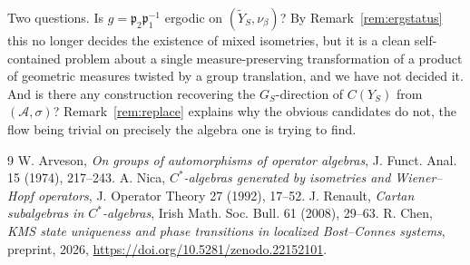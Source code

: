 \documentclass[11pt]{amsart}
\numberwithin{equation}{section}
\theoremstyle{definition}
\theoremstyle{remark}
\newcommand{\cA}{\mathcal{A}}
\newcommand{\pp}{\mathfrak{p}}
\begin{document}
Two questions. Is $g=\pp_2\pp_1^{-1}$ ergodic on $(\widetilde Y_S,\nu_\beta)$? By
Remark~\ref{rem:ergstatus} this no longer decides the existence of mixed isometries, but it
is a clean self-contained problem about a single measure-preserving transformation of a
product of geometric measures twisted by a group translation, and we have not decided it.
And is there any construction recovering
the $G_S$-direction of $C(Y_S)$ from $(\cA,\sigma)$? Remark~\ref{rem:replace} explains why the
obvious candidates do not, the flow being trivial on precisely the algebra one is trying to
find.

\begin{thebibliography}{9}
 W. Arveson, \emph{On groups of automorphisms of operator algebras}, J. Funct. Anal. 15 (1974), 217--243.
 A. Nica, \emph{$C^*$-algebras generated by isometries and Wiener--Hopf operators}, J. Operator Theory 27 (1992), 17--52.
 J. Renault, \emph{Cartan subalgebras in $C^*$-algebras}, Irish Math. Soc. Bull. 61 (2008), 29--63.
 R. Chen, \emph{KMS state uniqueness and phase transitions in localized Bost--Connes systems}, preprint, 2026, \newline\url{https://doi.org/10.5281/zenodo.22152101}.
\end{thebibliography}
\end{document}
